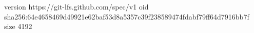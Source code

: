 version https://git-lfs.github.com/spec/v1
oid sha256:64e4658469d49921e62baf53d8a5357c39f238589474fdabf79ff64d7916bb7f
size 4192
